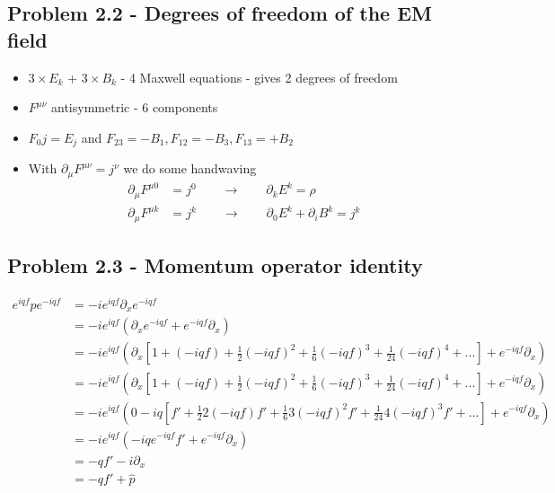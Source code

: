 \documentclass[../main.tex]{subfiles}
\begin{document}
\subsection{Problem 2.2 - Degrees of freedom of the EM field}
\begin{itemize}
\item $3\times E_k$ + $3\times B_k$ - 4 Maxwell equations - gives 2 degrees of freedom
\item $F^{\mu\nu}$ antisymmetric - 6 components
\item $F_0j=E_j$ and $F_{23}=-B_1, F_{12}=-B_3,F_{13}=+B_2$
\item With $\partial_\mu F^{\mu\nu}=j^\nu$ we do some handwaving
\begin{align}
\partial_\mu F^{\mu0}&=j^0\qquad\rightarrow\qquad \partial_kE^k=\rho\\
\partial_\mu F^{\mu k}&=j^k\qquad\rightarrow\qquad
\partial_0E^k+\partial_iB^k=j^k
\end{align}
\end{itemize}



\subsection{Problem 2.3 - Momentum operator identity}
\begin{align}
e^{iqf}\hat{p}e^{-iqf}
&=-ie^{iqf}\partial_xe^{-iqf}\\
&=-ie^{iqf}\left(\partial_xe^{-iqf}+e^{-iqf}\partial_x\right)\\
&=-ie^{iqf}\left(\partial_x\left[1+(-iqf)+\frac{1}{2}(-iqf)^2+\frac{1}{6}(-iqf)^3+\frac{1}{24}(-iqf)^4+...\right]+e^{-iqf}\partial_x\right)\\
&=-ie^{iqf}\left(\partial_x[1+(-iqf)+\frac{1}{2}(-iqf)^2+\frac{1}{6}(-iqf)^3+\frac{1}{24}(-iqf)^4+...]+e^{-iqf}\partial_x\right)\\
&=-ie^{iqf}\left(0-iq[f'+\frac{1}{2}2(-iqf)f'+\frac{1}{6}3(-iqf)^2f'+\frac{1}{24}4(-iqf)^3f'+...]+e^{-iqf}\partial_x\right)\\
&=-ie^{iqf}\left(-iqe^{-iqf}f'+e^{-iqf}\partial_x\right)\\
&=-qf'-i\partial_x\\
&=-qf'+\hat{p}
\end{align}
\end{document}
